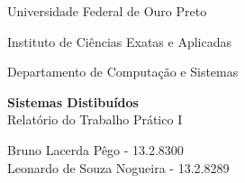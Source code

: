 \documentclass[brazil, a4paper,12pt]{article}
\begin{document}


\begin{titlepage}

  \vfill

  \begin{center}
    \begin{large}
      Universidade Federal de Ouro Preto
    \end{large}
  \end{center}

  \begin{center}
    \begin{large}
      Instituto de Ciências Exatas e Aplicadas
    \end{large}
  \end{center}

  \begin{center}
    \begin{large}
      Departamento de Computação e Sistemas
    \end{large}
  \end{center}

  \vfill

  \begin{center}
    \begin{Large}
	      \textbf{Sistemas Distibuídos} \\
	        Relatório do Trabalho Prático I\\
    \end{Large}
  \end{center}


  \vfill

  \begin{center}
    \begin{large}
      Bruno Lacerda Pêgo - 13.2.8300\\ Leonardo de Souza Nogueira - 13.2.8289
    \end{large}
  \end{center}


\end{titlepage}
\end{document}
